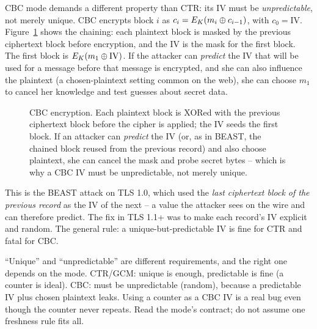 CBC mode demands a different property than CTR: its IV must be \emph{unpredictable}, not merely unique. CBC encrypts block $i$ as $c_i = E_K(m_i \oplus c_{i-1})$, with $c_0 = \mathrm{IV}$. Figure~\ref{ch38:fig-cbc} shows the chaining: each plaintext block is masked by the previous ciphertext block before encryption, and the IV is the mask for the first block. The first block is $E_K(m_1 \oplus \mathrm{IV})$. If the attacker can \emph{predict} the IV that will be used for a message before that message is encrypted, and she can also influence the plaintext (a chosen-plaintext setting common on the web), she can choose $m_1$ to cancel her knowledge and test guesses about secret data. \begin{figure}[H]
\centering
{}
\caption{CBC encryption. Each plaintext block is XORed with the previous ciphertext block before the cipher is applied; the IV seeds the first block. If an attacker can \emph{predict} the IV (or, as in BEAST, the chained block reused from the previous record) and also choose plaintext, she can cancel the mask and probe secret bytes -- which is why a CBC IV must be unpredictable, not merely unique.}
\label{ch38:fig-cbc}
\end{figure}

This is the BEAST attack on TLS 1.0, which used the \emph{last ciphertext block of the previous record} as the IV of the next -- a value the attacker sees on the wire and can therefore predict. The fix in TLS 1.1+ was to make each record's IV explicit and random. The general rule: a unique-but-predictable IV is fine for CTR and fatal for CBC.

\begin{trapbox}
``Unique'' and ``unpredictable'' are different requirements, and the right one depends on the mode. CTR/GCM: unique is enough, predictable is fine (a counter is ideal). CBC: must be unpredictable (random), because a predictable IV plus chosen plaintext leaks. Using a counter as a CBC IV is a real bug even though the counter never repeats. Read the mode's contract; do not assume one freshness rule fits all.
\end{trapbox}


